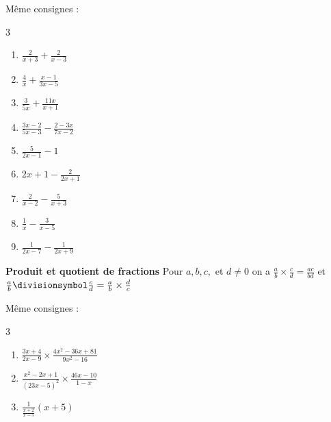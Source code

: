 \documentclass[main.tex]{subfiles}
\begin{document}
\begin{exercise} \label{chapitre02:fractionalgebriques:memedenominateur}  
Même consignes :\vspace{-0.75em}
\begin{multicols}{3}
\begin{enumerate}[label={$\Alph*(x)=$\rule{0pt}{1.8em}}, leftmargin=*] 
\item $\frac{2}{x+3}+\frac{2}{x-3}$
\item $\frac{4}{x}+\frac{x-1}{3x-5}$
\item $\frac{3}{5x}+\frac{11x}{x+1}$
\item $\frac{3x-2}{5x-3}-\frac{2-3x}{7x-2}$  
\item $\frac{5}{2x-1}-1$ 
\item $2x+1-\frac{2}{2x+1}$
\item $\frac{2}{x-2}-\frac{5}{x+3}$
\item $\frac{1}{x}-\frac{3}{x-5}$
\item $\frac{1}{2x-7} -\frac{1}{2x+9}$
\end{enumerate}
\end{multicols}  
\end{exercise}
 \begin{eBox}
 	\textbf{Produit et quotient de fractions}	Pour $a, b, c,$ et $d\neq 0$ on a  $\frac{a}{b}\times\frac{c}{d}=\frac{ac}{bd}$ \hfill et \hfill $\frac{a}{b}\divisionsymbol\frac{c}{d}=\frac{a}{b}\times\frac{d}{c}$
 \end{eBox}
\begin{exercise} \label{chapitre02:fractionalgebriques:produit}  
	Même consignes :\vspace{-0.5em}
	\begin{multicols}{3}
		\begin{enumerate}[label={$\Alph*(x)=$\rule{0pt}{1.8em}}, leftmargin=*]  
			\item $\frac{3x+4}{2x-9}\times \frac{4x^2-36x+81}{9x^2-16}$
			\item $\frac{x^2-2x+1}{(23x-5)^2}\times \frac{46x-10}{1-x}$
			\item $\frac{1}{\frac{x+2}{x-5}}  (x+5)$ 
		\end{enumerate}
	\end{multicols}  
\end{exercise}
\end{document}
